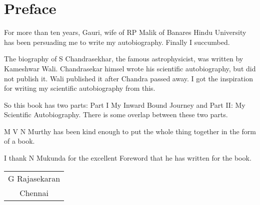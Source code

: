 \chapter{Preface}

For more than ten years, Gauri, wife of RP Malik of Banares Hindu Universi\-ty has been persuading me to write my autobio\-graphy. Finally I succumbed.

The biography of S Chandrasekhar, the famous astrophysicist, was
written by Kameshwar Wali. Chandrasekar himsel wrote his scientific
autobiography, but did not publish it. Wali published it after Chandra
passed away. I got the inspiration for writing my scientific autobio\-graphy
from this.

So this book has two parts: Part I My Inward  Bound Journey and Part II:
My Scientific Autobiography. There is some overlap between these two
parts.

M V N Murthy has been kind enough to put the whole thing together in the 
form of a book.

I thank N Mukunda for the excellent Foreword that he has written for 
the book.

\vskip 1cm
\begin{flushright}
\begin{tabular}{c}
G Rajasekaran\\
Chennai
\end{tabular}
\end{flushright}
